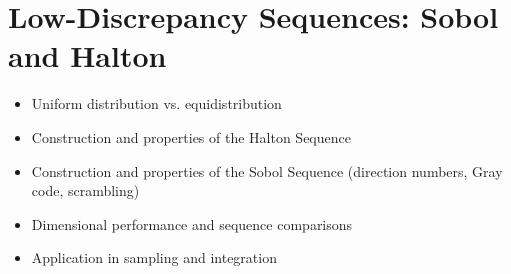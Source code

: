 \chapter{Low-Discrepancy Sequences: Sobol and Halton}

\begin{itemize}
    \item Uniform distribution vs. equidistribution
    \item Construction and properties of the Halton Sequence
    \item Construction and properties of the Sobol Sequence (direction numbers, Gray code, scrambling)
    \item Dimensional performance and sequence comparisons
    \item Application in sampling and integration
\end{itemize}